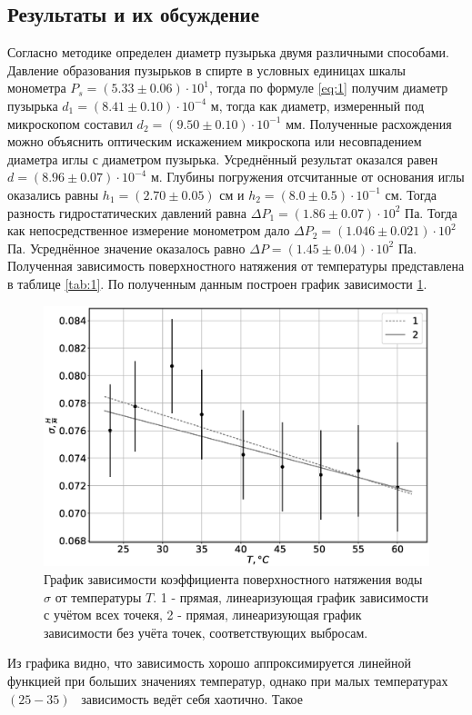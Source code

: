 \documentclass[a4paper,12pt]{report}
\begin{document}
\begin{multicols}{2}
\section{Результаты и их обсуждение}
Согласно методике определен диаметр пузырька двумя различными способами. Давление образования пузырьков 
в спирте в условных единицах шкалы монометра $P_s = (5.33 \pm 0.06) \cdot 10 ^ {1}$, тогда по формуле \ref{eq:1} получим диаметр 
пузырька $d_1 = (8.41 \pm 0.10) \cdot 10 ^ {-4}$ м, тогда как диаметр, измеренный под микроскопом составил $d_2 = (9.50 \pm 0.10) \cdot 10 ^ {-1}$ мм. Полученные расхождения 
можно объяснить оптическим искажением микроскопа или несовпадением диаметра иглы с диаметром пузырька.
Усреднённый результат оказался равен $d = (8.96 \pm 0.07) \cdot 10 ^ {-4}$ м. 
Глубины погружения отсчитанные от основания иглы оказались равны $h_1 = (2.70 \pm 0.05)$ см и $h_2 = (8.0 \pm 0.5) \cdot 10 ^ {-1}$ см. 
Тогда разность гидростатических давлений равна $\Delta P_1 = (1.86 \pm 0.07) \cdot 10 ^ {2}$ Па. Тогда как непосредственное 
измерение монометром дало $\Delta P_2 = (1.046 \pm 0.021) \cdot 10 ^ {2}$ Па. Усреднённое значение оказалось равно $\Delta P = (1.45 \pm 0.04) \cdot 10 ^ {2}$ Па. 
Полученная зависимость поверхностного натяжения от температуры представлена в таблице \ref{tab:1}. По 
полученным данным построен график зависимости \ref{fig:2}.  
\begin{figure}[H]
    \centering
    \includegraphics[width=0.7\linewidth]{sT.eps}
    \caption{График зависимости коэффициента поверхностного натяжения воды $\sigma$ от температуры $T$.
        1 - прямая, линеаризующая график зависимости с учётом всех точекя, 
        2 - прямая, линеаризующая график зависимости без учёта точек, соответствующих выбросам.}
    \label{fig:2}
\end{figure}
Из графика видно, что зависимость хорошо аппроксимируется линейной функцией при больших значениях температур, 
однако при малых температурах $(25 - 35)$ \textcelsius \, зависимость ведёт себя хаотично. Такое 

\end{multicols}
\end{document}
